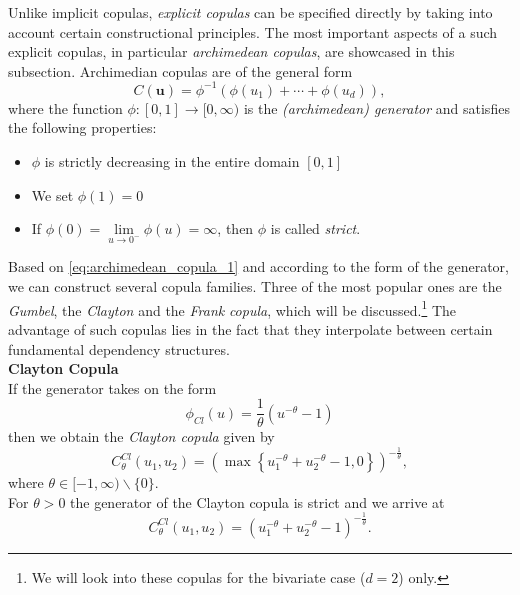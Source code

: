 
Unlike implicit copulas, \textit{explicit copulas} can be specified directly by taking into account certain constructional principles. The most important aspects of a such explicit copulas, in particular \textit{archimedean copulas}, are showcased in this subsection. Archimedian copulas are of the general form
\begin{equation}C(\boldsymbol{u})=\phi^{-1}\left(\phi\left(u_{1}\right)+\cdots+\phi\left(u_{d}\right)\right),
\label{eq:archimedean_copula_1}
\end{equation}
where the function $\phi:[0,1] \rightarrow [0, \infty)$ is the \textit{(archimedean) generator} and satisfies the following properties:
\begin{itemize}
\item $\phi$ is strictly decreasing in the entire domain $[0, 1]$
\item We set $\phi (1) = 0$
\item If  $\phi(0)=\lim \limits _{u \rightarrow 0^{-}} \phi(u)= \infty$, then $\phi$ is called \textit{strict}.
\end{itemize}
Based on \autoref{eq:archimedean_copula_1} and according to the form of the generator, we can construct several copula families. Three of the most popular ones are the \textit{Gumbel}, the \textit{Clayton} and the \textit{Frank} \textit{copula}, which will be discussed.\footnote{We will look into these copulas for the bivariate case ($d=2$) only.} The advantage of such copulas lies in the fact that they interpolate between certain fundamental dependency structures.\\

\textbf{Clayton Copula}\\
If the generator takes on the form
\begin{equation}
\phi_{C l}(u)=\frac{1}{\theta}\left(u^{-\theta}-1\right)
\end{equation}
then we obtain the \textit{Clayton copula} given by
\begin{equation}
C_{\theta}^{C l}\left(u_{1}, u_{2}\right)=\left(\max \left\{u_{1}^{-\theta}+u_{2}^{-\theta}-1,0\right\}\right)^{-\frac{1}{\theta}},
\end{equation}
where $\theta \in[-1, \infty) \backslash\{0\}$.\\
For $\theta > 0$ the generator of the Clayton copula is strict and we arrive at 
\begin{equation}
C_{\theta}^{C l}\left(u_{1}, u_{2}\right)= (u_{1}^{-\theta}+u_{2}^{-\theta}-1)^{-\frac{1}{\theta}}.
\end{equation}

